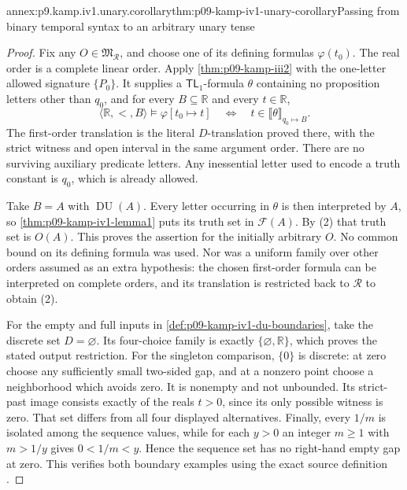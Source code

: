 \begin{annexitem}{annex:p9.kamp.iv1.unary.corollary}{thm:p09-kamp-iv1-unary-corollary}{Passing from binary temporal syntax to an arbitrary unary tense}
\begin{proof}
Fix any \(O\in\mathfrak M_{\mathcal R}\), and choose one of
its defining formulas \(\varphi(t_0)\). The real order is a
complete linear order. Apply \cref{thm:p09-kamp-iii2} with the
one-letter allowed signature \(\{P_0\}\). It supplies a
\(\mathsf{TL}_1\)-formula \(\theta\) containing no
proposition letters other than \(q_0\), and for every
\(B\subseteq\mathbb R\) and every \(t\in\mathbb R\),
\[
 \langle\mathbb R,<,B\rangle\models\varphi[t_0\mapsto t]
       \quad\Longleftrightarrow\quad
       t\in\llbracket\theta\rrbracket_{q_0\mapsto B}.
 \tag{2}
\]
The first-order translation is the literal \(D\)-translation
proved there, with the strict witness and open interval in the
same argument order. There are no surviving auxiliary predicate
letters. Any inessential letter used to encode a truth constant is
\(q_0\), which is already allowed.

Take \(B=A\) with \(\operatorname{DU}(A)\). Every letter
occurring in \(\theta\) is then interpreted by \(A\), so
\cref{thm:p09-kamp-iv1-lemma1} puts its truth set in
\(\mathcal F(A)\). By (2) that truth set is \(O(A)\).
This proves the assertion for the initially arbitrary \(O\).
No common bound on its defining formula was used. Nor was a
uniform family over other orders assumed as an extra hypothesis:
the chosen first-order formula can be interpreted on complete
orders, and its translation is restricted back to \(\mathcal R\)
to obtain (2).

For the empty and full inputs in
\cref{def:p09-kamp-iv1-du-boundaries}, take the discrete set
\(D=\varnothing\). Its four-choice family is exactly
\(\{\varnothing,\mathbb R\}\), which proves the stated
output restriction. For the singleton comparison, \(\{0\}\)
is discrete: at zero choose any sufficiently small two-sided gap,
and at a nonzero point choose a neighborhood which avoids zero.
It is nonempty and not unbounded. Its strict-past image consists
exactly of the reals \(t>0\), since its only possible witness
is zero. That set differs from all four displayed alternatives.
Finally, every \(1/m\) is isolated among the sequence values,
while for each \(y>0\) an integer \(m\geq1\) with
\(m>1/y\) gives \(0<1/m<y\). Hence the sequence set
has no right-hand empty gap at zero. This verifies both boundary
examples using the exact source definition
\cite[ch.~IV, def.~1 and corollary, pp.~96--97]{Kamp1968}.
\end{proof}
\end{annexitem}


